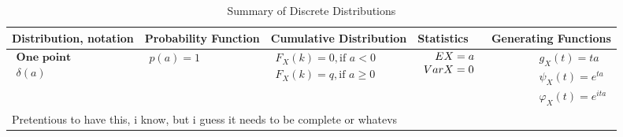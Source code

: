 \documentclass{article}
\begin{document}
\begin{landscape}
    \begin{table}[ht]
        \centering
        \caption{Summary of Discrete Distributions}
        \label{tab:probability_distributions}
        
        \begin{tabular}{@{}l p{6.5cm} p{4.5cm} p{3.0cm} r@{}}
        \toprule
        Distribution, notation & Probability Function & Cumulative Distribution & Statistics & Generating Functions \\ 
        \midrule

    
        $\begin{array}{l}
            \textbf{One point} \\
            \delta(a) \\
    \end{array}$ & 
    $\begin{array}{l}
    \displaystyle p(a) = 1\\
    \end{array}$ & 
    $\begin{array}{l}
        \displaystyle F_X(k) = 0, \text{if } a < 0\\
        \displaystyle F_X(k) = q, \text{if } a \geq 0 \\
    \end{array}$ & 
    $\begin{array}{l}
    \displaystyle \hspace{0.36cm}  EX = a \\
    \displaystyle VarX = 0
    \end{array}$ & 
    $\begin{array}{r}
    \displaystyle g_X(t) = ta \\
    \displaystyle \psi_X(t) = e^{ta} \\
    \displaystyle \varphi_X(t) = e^{ita}
    \end{array}$ \\
    \multicolumn{4}{p{19cm}}{Pretentious to have this, i know, but i guess it needs to be complete or whatevs} \\



\end{tabular}
\end{table}
\end{landscape}
\end{document}
